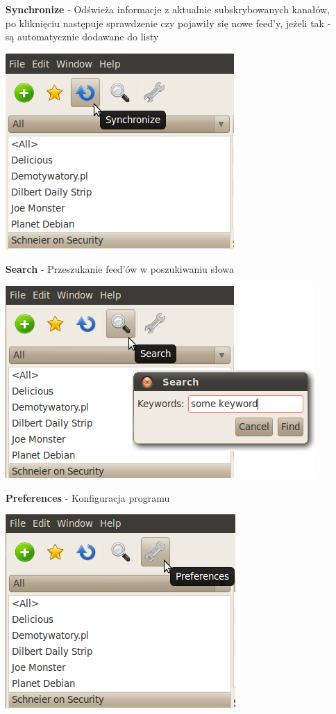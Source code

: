\documentclass[a4paper,11pt]{report}
\begin{document}
\begin{itemize}
  \item[\textbf{Synchronize}] - Odświeża informacje z aktualnie subskrybowanych
  kanałów, po kliknięciu następuje sprawdzenie czy pojawiły się nowe feed'y,
  jeżeli tak - są automatycznie dodawane do listy
  \begin{center}
  \includegraphics[scale=0.5]{./img/menu_sync.png}
  \end{center}

  \item[\textbf{Search}] - Przeszukanie feed'ów w poszukiwaniu słowa

  \includegraphics[scale=0.5]{./img/menu_search.png}


  \item[\textbf{Preferences}] - Konfiguracja programu

  \includegraphics[scale=0.5]{./img/menu_pref.png}

\end{itemize}
\end{document}
